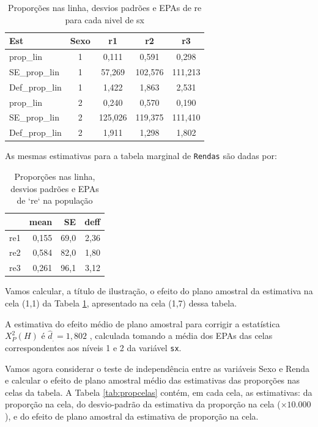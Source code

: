 \documentclass[]{book}
\theoremstyle{definition}
\theoremstyle{definition}
\theoremstyle{definition}
\theoremstyle{remark}
\begin{document}
\begin{table}

\caption{\label{tab:proplinha}Proporções nas linha, desvios padrões e EPAs de re para cada nivel de sx}
\centering
\begin{tabular}[t]{lcccc}
\toprule
Est & Sexo & r1 & r2 & r3\\
\midrule
prop\_lin & 1 & 0,111 & 0,591 & 0,298\\
SE\_prop\_lin & 1 & 57,269 & 102,576 & 111,213\\
Def\_prop\_lin & 1 & 1,422 & 1,863 & 2,531\\
prop\_lin & 2 & 0,240 & 0,570 & 0,190\\
SE\_prop\_lin & 2 & 125,026 & 119,375 & 111,410\\
Def\_prop\_lin & 2 & 1,911 & 1,298 & 1,802\\
\bottomrule
\end{tabular}
\end{table}

As mesmas estimativas para a tabela marginal de \texttt{Rendas} são
dadas por:

\begin{table}

\caption{\label{tab:unnamed-chunk-2}Proporções nas linha, desvios padrões e EPAs de `re` na população}
\centering
\begin{tabular}[t]{lrrr}
\toprule
  & mean & SE & deff\\
\midrule
re1 & 0,155 & 69,0 & 2,36\\
re2 & 0,584 & 82,0 & 1,80\\
re3 & 0,261 & 96,1 & 3,12\\
\bottomrule
\end{tabular}
\end{table}

Vamos calcular, a título de ilustração, o efeito do plano amostral da
estimativa na cela (1,1) da Tabela \ref{tab:proplinha}, apresentado na
cela (1,7) dessa tabela.

A estimativa do efeito médio de plano amostral para corrigir a
estatística \(X_{P}^{2}\left( H\right)\) é \(\hat{d}_{.}=1,802\) ,
calculada tomando a média dos EPAs das celas correspondentes aos níveis
1 e 2 da variável \texttt{sx}.

Vamos agora considerar o teste de independência entre as variáveis Sexo
e Renda e calcular o efeito de plano amostral médio das estimativas das
proporções nas celas da tabela. A Tabela \ref{tab:propcelas} contém, em
cada cela, as estimativas: da proporção na cela, do desvio-padrão da
estimativa da proporção na cela (\(\times 10.000\)), e do efeito de
plano amostral da estimativa de proporção na cela.
\end{document}
